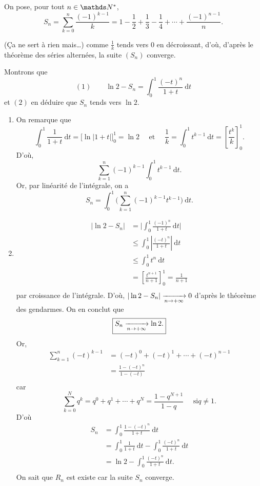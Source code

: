 \begin{exo}
	On pose, pour tout $n \in \N^*$, \[
		S_n = \sum_{k=0}^{n} \frac{(-1)^{k-1}}{k} = 1 - \frac{1}{2} + \frac{1}{3} - \frac{1}{4} + \cdots + \frac{(-1)^{n-1}}{n}
	.\]

	(Ça ne sert à rien mais\ldots) comme $\frac{1}{k}$\/ tends vers 0 en décroissant, d'où, d'après le théorème des séries alternées, la suite $(S_n)$\/ converge.

	Montrons que \[
		(1)\qquad\ln 2 - S_n = \int_{0}^{1} \frac{(-t)^n}{1+t}~\mathrm{d}t
	\] et $(2)$ en déduire que $S_n$\/ tends vers $\ln 2$.

	\begin{enumerate}
		\item
			On remarque que \[
				\int_{0}^{1} \frac{1}{1+t}~\mathrm{d}t = \big[\ln |1+t|\big]_0^1 = \ln 2
				\quad
				\text{ et }
				\quad
				\frac{1}{k} = \int_{0}^{1} t^{k-1}~\mathrm{d}t = \left[ \frac{t^k}{k} \right]^1_0.
			\]
			D'où, \[
				\sum_{k=1}^n (-1)^{k-1} \int_{0}^{1} t^{k-1}~\mathrm{d}t
			.\]
			Or, par linéarité de l'intégrale, on a \[
				S_n = \int_{0}^{1} \bigg(\sum_{k=1}^{n} (-1)^{k-1} t^{k-1}\bigg)~\mathrm{d}t
			.\]
		\item
			\begin{align*}
				|\ln 2 - S_n| &= \bigg| \int_{0}^{1} \frac{(-1)^n}{1+t}~\mathrm{d}t \bigg| \\
				&\le \int_{0}^{1} \left| \frac{(-t)^n}{1+t} \right| ~\mathrm{d}t\\
				&\le \int_{0}^{1} t^n~\mathrm{d}t\\
				&= \left[ \frac{t^{n+1}}{n + 1} \right]_0^1 = \frac{1}{n+1} \\
			\end{align*}
			par croissance de l'intégrale. D'où, $|\ln 2 - S_n| \xrightarrow[n\to +\infty]{} 0$\/ d'après le théorème des gendarmes.
			On en conclut que \[
				\boxed{S_n \xrightarrow[n\to +\infty]{} \ln 2.}
			\]
			Or,
			\begin{align*}
				\sum_{k=1}^n (-t)^{k-1} &= (-t)^0 + (-t)^1 + \cdots + (-t)^{n-1} \\
				&= \frac{1 - (-t)^n}{1 - (-t)} \\
			\end{align*}
			car \[
				\sum_{k=0}^{N} q^k = q^0 + q^1 + \cdots + q^N = \frac{1 - q^{N+1}}{1-q} \quad \text{ si} q \neq 1
			.\]
			D'où
			\begin{align*}
				S_n &= \int_{0}^{1} \frac{1 - (-t)^n}{1 + t}~\mathrm{d}t\\
				&= \int_{0}^{1} \frac{1}{1+t}~\mathrm{d}t  - \int_{0}^{1} \frac{(-t)^n}{1+t}~\mathrm{d}t \\
				&= \boxed{\ln 2 - \int_{0}^{1} \frac{(-t)^n}{1+t}~\mathrm{d}t.} \\
			\end{align*}
			On sait que $R_n$\/ est existe car la suite $S_n$\/ converge.


\end{enumerate}
\end{exo}
